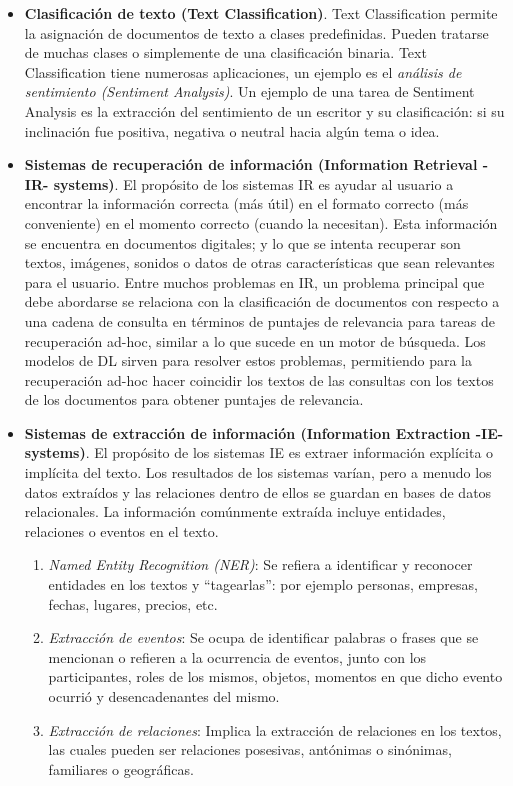 \documentclass[12pt,a4paper]{article}
\begin{document}
\begin{sloppypar}
\begin{itemize}
\item \textbf{Clasificación de texto (Text Classification)}. Text Classification permite la asignación de documentos de texto a clases predefinidas. Pueden tratarse de muchas clases o simplemente de una clasificación binaria. Text Classification tiene numerosas aplicaciones, un ejemplo es el \textit{análisis de sentimiento (Sentiment Analysis)}. Un ejemplo de una tarea de Sentiment Analysis es la extracción del sentimiento de un escritor y su clasificación: si su inclinación fue positiva, negativa o neutral hacia algún tema o idea.

\item \textbf{Sistemas de recuperación de información (Information Retrieval -IR- systems)}. El propósito de los sistemas IR es ayudar al usuario a encontrar la información correcta (más útil) en el formato correcto (más conveniente) en el momento correcto (cuando la necesitan). Esta información se encuentra en documentos digitales; y lo que se intenta recuperar son textos, imágenes, sonidos o datos de otras características que sean relevantes para el usuario. Entre muchos problemas en IR, un problema principal que debe abordarse se relaciona con la clasificación de documentos con respecto a una cadena de consulta en términos de puntajes de relevancia para tareas de recuperación ad-hoc, similar a lo que sucede en un motor de búsqueda. Los modelos de DL sirven para resolver estos problemas, permitiendo para la recuperación ad-hoc hacer coincidir los textos de las consultas con los textos de los documentos para obtener puntajes de relevancia.

\item \textbf{Sistemas de extracción de información (Information Extraction -IE- systems)}. El propósito de los sistemas IE es extraer información explícita o implícita del texto. Los resultados de los sistemas varían, pero a menudo los datos extraídos y las relaciones dentro de ellos se guardan en bases de datos relacionales. La información comúnmente extraída incluye entidades, relaciones o eventos en el texto. 

\begin{enumerate}
\item \textit{Named Entity Recognition (NER)}: Se refiera a identificar y reconocer entidades en los textos y “tagearlas”: por ejemplo personas, empresas, fechas, lugares, precios, etc.
\item \textit{Extracción de eventos}: Se ocupa de identificar palabras o frases que se mencionan o refieren a la ocurrencia de eventos, junto con los participantes, roles de los mismos, objetos, momentos en que dicho evento ocurrió y desencadenantes del mismo.
\item \textit{Extracción de relaciones}: Implica la extracción de relaciones en los textos, las cuales pueden ser relaciones posesivas, antónimas o sinónimas, familiares o geográficas.
\end{enumerate}


\end{itemize}
\end{sloppypar}
\end{document}

